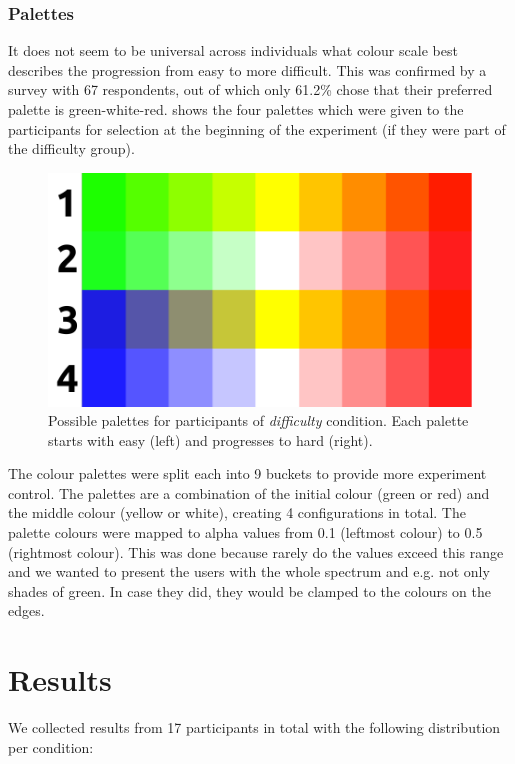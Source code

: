 \subsubsection{Palettes}

It does not seem to be universal across individuals what colour scale best describes the progression from easy to more difficult.
This was confirmed by a survey with 67 respondents, out of which only 61.2\% chose that their preferred palette is green-white-red.
 shows the four palettes which were given to the participants for selection at the beginning of the experiment (if they were part of the difficulty group).

\begin{figure}[ht]
\centering
\includegraphics[width=0.6\linewidth]{img/palettes_all.pdf}
\caption{Possible palettes for participants of \emph{difficulty} condition. Each palette starts with easy (left) and progresses to hard (right).}
\label{fig:palettes}
\vspace{-0.1cm}
\end{figure}

The colour palettes were split each into 9 buckets to provide more experiment control.
The palettes are a combination of the initial colour (green or red) and the middle colour (yellow or white), creating 4 configurations in total.
The palette colours were mapped to alpha values from 0.1 (leftmost colour) to 0.5 (rightmost colour).
This was done because rarely do the values exceed this range and we wanted to present the users with the whole spectrum and e.g. not only shades of green.
In case they did, they would be clamped to the colours on the edges.

\section{Results}

We collected results from 17 participants in total with the following distribution per condition:

\vspace{-0.1cm}

